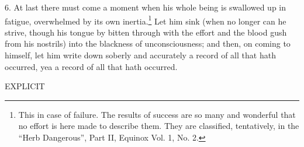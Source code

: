6. At last there must come a moment when his whole being is swallowed up in fatigue, overwhelmed by its own inertia.\footnote{This in case of failure. The results of success are so many and wonderful that no effort is here made to describe them. They are classified, tentatively, in the \enquote{Herb Dangerous}, Part II, Equinox Vol. 1, No. 2.} Let him sink (when no longer can he strive, though his tongue by bitten through with the effort and the blood gush from his nostrils) into the blackness of unconsciousness; and then, on coming to himself, let him write down soberly and accurately a record of all that hath occurred, yea a record of all that hath occurred.

{
\centering

\textsc{EXPLICIT}
\par
}
